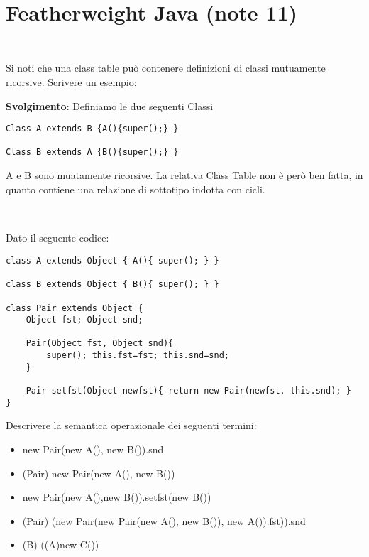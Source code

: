 \section{Featherweight Java (note 11)} 
\subsection*{}\
\\ 
Si noti che una class table pu\`o contenere definizioni di classi mutuamente ricorsive.
\linebreak Scrivere un esempio:


\vspace{0,5cm}
\noindent
\textbf{Svolgimento}:\linebreak
Definiamo le due seguenti Classi

\begin{lstlisting}
Class A extends B {A(){super();} }

Class B extends A {B(){super();} }

\end{lstlisting}

\noindent
A e B sono muatamente ricorsive. La relativa Class Table non \`e per\`o ben fatta, in quanto contiene una relazione di sottotipo indotta con cicli.

\vspace{1cm}
\subsection*{}\
\\ 
Dato il seguente codice:
\begin{lstlisting}
class A extends Object { A(){ super(); } }

class B extends Object { B(){ super(); } }

class Pair extends Object { 
	Object fst; Object snd;
	
	Pair(Object fst, Object snd){
		super(); this.fst=fst; this.snd=snd; 
	} 
	
	Pair setfst(Object newfst){ return new Pair(newfst, this.snd); }
}

\end{lstlisting}

\vspace{0,5cm}
Descrivere la semantica operazionale dei seguenti termini:

\begin{itemize}
\item new Pair(new A(), new B()).snd
\item (Pair) new Pair(new A(), new B())
\item new Pair(new A(),new B()).setfst(new B())
\item (Pair) (new Pair(new Pair(new A(), new B()), new A()).fst)).snd
\item (B) ((A)new C())
\end{itemize}

